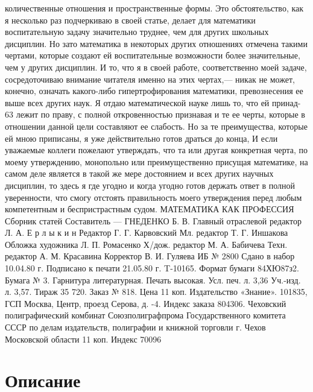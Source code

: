 \documentclass[12pt, a4paper, openany]{book}
\begin{document}
количественные отношения и пространственные формы. Это 
обстоятельство, как я несколько раз подчеркиваю в своей 
статье, делает для математики воспитательную задачу 
значительно труднее, чем для других школьных  
дисциплин. Но зато математика в некоторых других отношениях 
отмечена такими чертами, которые создают ей  
воспитательные возможности более значительные, чем у других 
дисциплин. И то, что я в своей работе, соответственно 
моей задаче, сосредоточиваю внимание читателя именно 
на этих чертах,— никак не может, конечно, означать 
какого-либо гипертрофирования математики,  
превознесения ее выше всех других наук. 
Я отдаю математической науке лишь то, что ей принад- 
63 
лежит по праву, с полной откровенностью признавая и те 
ее черты, которые в отношении данной цели составляют 
ее слабость. Но за те преимущества, которые ей мною 
приписаны, я уже действительно готов драться до конца, 
И если уважаемые коллеги пожелают утверждать, что та 
или другая конкретная черта, по моему утверждению, 
монопольно или преимущественно присущая математике, 
на самом деле является в такой же мере достоянием и 
всех других научных дисциплин, то здесь я где угодно 
и когда угодно готов держать ответ в полной уверенности, 
что смогу отстоять правильность моего утверждения перед 
любым компетентным и беспристрастным судом. 
МАТЕМАТИКА КАК ПРОФЕССИЯ 
Сборник статей 
Составитель — ГНЕДЕНКО Б. В. 
Главный отраслевой редактор Л. А. Е р л ы к и н 
Редактор Г. Г. Карвовский 
Мл. редактор Т. Г. Иншакова 
Обложка художника Л. П. Ромасенко 
Х/дож. редактор М. А. Бабичева 
Техн. редактор А. М. Красавина 
Корректор В. И. Гуляева 
ИБ № 2800 
Сдано в набор 10.04.80 г. Подписано к печати 21.05.80 г. T-10165. 
Формат бумаги 84ХЮ87з2. Бумага № 3. Гарнитура литературная. 
Печать высокая. Усл. печ. л. 3,36 Уч.-изд. л. 3,57. Тираж 35 720. 
Заказ № 818. Цена 11 коп. Издательство «Знание». 101835, ГСП 
Москва, Центр, проезд Серова, д. -4. Индекс заказа 804306. 
Чеховский полиграфический комбинат Союзполиграфпрома 
Государственного комитета СССР 
по делам издательств, полиграфии и книжной торговли 
г. Чехов Московской области 
11 коп. 
Индекс 70096

	
	\newpage
	\tableofcontents
	
	\thispagestyle{empty} %
	
	\newpage
	
	\setcounter{secnumdepth}{0}
	
	
		\section*{Описание}
	
\end{document}
